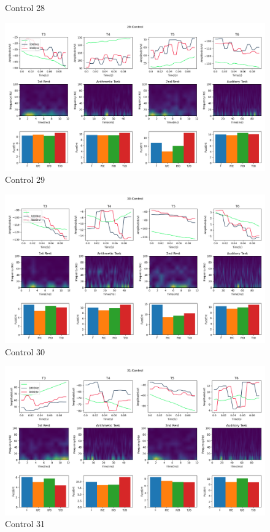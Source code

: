 \documentclass[10pt]{article}
\begin{document}
\begin{landscape}
\begin{figure}
  \caption{Control 28}
  \label{fig:control_28}
\end{figure}
\clearpage
\begin{figure}
  \includegraphics[width=7.2in]{figures/29.png}
  \caption{Control 29}
  \label{fig:control_29}
\end{figure}
\clearpage
\begin{figure}
  \includegraphics[width=7.2in]{figures/30.png}
  \caption{Control 30}
  \label{fig:control_30}
\end{figure}
\clearpage
\begin{figure}
  \includegraphics[width=7.2in]{figures/31.png}
  \caption{Control 31}
  \label{fig:control_31}
\end{figure}


\end{landscape}
\end{document}
